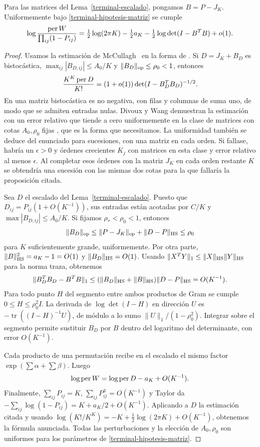 \begin{proposicion}\label{terminal-permanente}
Para las matrices del Lema~\ref{terminal-escalado}, pongamos $B=P-J_K$. Uniformemente bajo
\eqref{terminal-hipotesis-matriz} se cumple
\[
 \log\frac{\operatorname{per} W}{\prod_{ij}(1-P_{ij})}
 =\tfrac12\log(2\pi K)-\tfrac12a_K
   -\tfrac12\log\det(I-B^TB)+o(1).
\]
\end{proposicion}
\begin{proof}
Usamos la estimación de McCullagh~\cite{mccullagh} en la forma de \cite[Proposición~3.1]{dw}. Si
$D=J_K+B_D$ es bistocástica, $\max_{ij}|B_{D,ij}|\le A_0/K$ y $\|B_D\|_{\rm op}\le\rho_0<1$, entonces
\[
 \frac{K^K\operatorname{per} D}{K!}=(1+o(1))\det(I-B_D^TB_D)^{-1/2}.
\]
En \cite[Sección~2.1]{dw} una matriz bistocástica es no negativa, con filas y columnas de suma uno,
de modo que se admiten entradas nulas. Divoux y Wang demuestran la estimación con un error relativo
que tiende a cero uniformemente en la clase de matrices con cotas $A_0,\rho_0$ fijas
\cite[Observación~2.1]{dw}, que es la forma que necesitamos. La uniformidad también se deduce del
enunciado para sucesiones, con una matriz en cada orden. Si fallase, habría un $\epsilon>0$ y órdenes
crecientes $K_j$ con matrices
en esta clase y error relativo al menos $\epsilon$. Al completar esos órdenes con la matriz $J_K$ en
cada orden restante $K$ se obtendría una sucesión con las mismas dos cotas para la que fallaría la
proposición citada.

Sea $D$ el escalado del Lema~\ref{terminal-escalado}. Puesto que $D_{ij}=P_{ij}(1+O(K^{-1}))$, sus
entradas están acotadas por $C/K$ y $\max|B_{D,ij}|\le A_0/K$. Si fijamos $\rho_*<\rho_0<1$, entonces
\[
 \|B_D\|_{\rm op}\le\|P-J_K\|_{\rm op}+\|D-P\|_{\rm HS}
       \le\rho_0
\]
para $K$ suficientemente grande, uniformemente. Por otra parte,
$\|B\|_{\rm HS}^2=a_K-1=O(1)$ y $\|B_D\|_{\rm HS}=O(1)$. Usando
$\|X^TY\|_1\le\|X\|_{\rm HS}\|Y\|_{\rm HS}$ para la norma traza, obtenemos
\[
 \|B_D^TB_D-B^TB\|_1
 \le(\|B_D\|_{\rm HS}+\|B\|_{\rm HS})\|D-P\|_{\rm HS}
 =O(K^{-1}).
\]
Para todo punto $H$ del segmento entre ambos productos de Gram se cumple $0\le H\le\rho_0^2I$. La
derivada de $\log\det(I-H)$ en dirección $U$ es $-\operatorname{tr}((I-H)^{-1}U)$, de módulo a lo sumo
$\|U\|_1/(1-\rho_0^2)$. Integrar sobre el segmento permite sustituir $B_D$ por $B$ dentro del
logaritmo del determinante, con error $O(K^{-1})$.

Cada producto de una permutación recibe en el escalado el mismo factor $\exp(\sum\alpha+\sum\beta)$.
Luego
\[
 \log\operatorname{per} W=\log\operatorname{per} D-a_K+O(K^{-1}).
\]
Finalmente, $\sum_{ij}P_{ij}=K$, $\sum_{ij}P_{ij}^3=O(K^{-1})$ y Taylor da
$-\sum_{ij}\log(1-P_{ij})=K+a_K/2+O(K^{-1})$. Aplicando a $D$ la estimación citada y usando
$\log(K!/K^K)=-K+\tfrac12\log(2\pi K)+O(K^{-1})$, obtenemos la fórmula anunciada. Todas las
perturbaciones y la elección de $A_0,\rho_0$ son uniformes para los parámetros de
\eqref{terminal-hipotesis-matriz}.
\end{proof}

